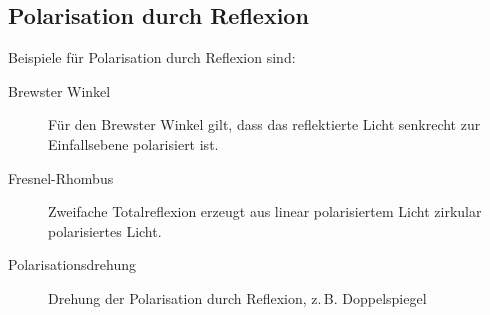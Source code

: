 
\subsection{Polarisation durch Reflexion}
Beispiele für Polarisation durch Reflexion sind:
\begin{description}
\item[Brewster Winkel] Für den Brewster Winkel gilt, dass das
  reflektierte Licht senkrecht zur Einfallsebene polarisiert ist.
\item[Fresnel-Rhombus] Zweifache Totalreflexion erzeugt aus linear
  polarisiertem Licht zirkular polarisiertes Licht.
\item[Polarisationsdrehung] Drehung der Polarisation durch Reflexion, 
  z.\,B. Doppelspiegel
\end{description}



